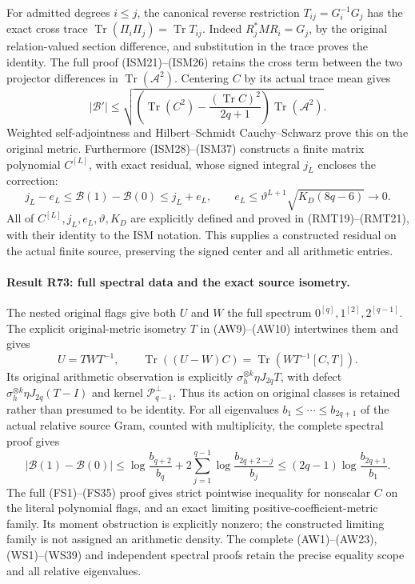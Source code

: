 For admitted degrees \(i\leq j\), the canonical reverse
restriction \(T_{ij}=G_i^{-1}G_j\)
has the exact cross trace
\(\operatorname{Tr}(\Pi_i\Pi_j)=\operatorname{Tr}T_{ij}\).
Indeed \(R_j^*MR_i=G_j\), by the original relation-valued
section difference, and substitution in the trace proves
the identity.  The full proof (ISM21)--(ISM26) retains the
cross term between the two projector differences in
\(\operatorname{Tr}(\mathcal A^2)\).  Centering \(C\) by
its actual trace mean gives
\[
 |\mathcal B'|\leq
 \sqrt{\left(\operatorname{Tr}(C^2)
        -\frac{(\operatorname{Tr}C)^2}{2q+1}\right)
                      \operatorname{Tr}(\mathcal A^2)} .
\]
Weighted self-adjointness and Hilbert--Schmidt
Cauchy--Schwarz prove this on the original metric.
Furthermore (ISM28)--(ISM37) constructs a finite
matrix polynomial \(C^{[L]}\), with exact residual,
whose signed integral \(j_L\) encloses the correction:
\[
 j_L-e_L\leq\mathcal B(1)-\mathcal B(0)\leq j_L+e_L,
 \qquad
 e_L\leq\vartheta^{L+1}\sqrt{K_D(8q-6)}\longrightarrow0.
\]
All of \(C^{[L]},j_L,e_L,\vartheta,K_D\) are explicitly
defined and proved in (RMT19)--(RMT21), with their
identity to the ISM notation.  This supplies a constructed
residual on the actual finite source, preserving the
signed center and all arithmetic entries.

\paragraph{Result R73: full spectral data and the exact source isometry.}
The nested original flags give both $U$ and $W$ the full
spectrum $0^{[q]},1^{[2]},2^{[q-1]}$.
The explicit original-metric isometry $T$ in (AW9)--(AW10)
intertwines them and gives
\[
U=TWT^{-1},\qquad
\operatorname{Tr}((U-W)C)=\operatorname{Tr}(WT^{-1}[C,T]).
\]
Its original arithmetic observation is explicitly
$\sigma_h^{\otimes k}\eta J_{2q}T$, with defect
$\sigma_h^{\otimes k}\eta J_{2q}(T-I)$ and kernel
$\mathcal P_{q-1}^{\perp}$. Thus its action on original
classes is retained rather than presumed to be identity.
For all eigenvalues $b_1\le\cdots\le b_{2q+1}$ of the
actual relative source Gram, counted with multiplicity,
the complete spectral proof gives
\[
|\mathcal B(1)-\mathcal B(0)|
\le\log\frac{b_{q+2}}{b_q}
 +2\sum_{j=1}^{q-1}\log\frac{b_{2q+2-j}}{b_j}
\le(2q-1)\log\frac{b_{2q+1}}{b_1}.
\]
The full (FS1)--(FS35) proof gives strict pointwise
inequality for nonscalar $C$ on the literal polynomial
flags, and an exact limiting positive-coefficient-metric
family. Its moment obstruction is explicitly nonzero;
the constructed limiting family is not assigned an
arithmetic density. The complete (AW1)--(AW23), (WS1)--(WS39)
and independent spectral proofs retain the precise
equality scope and all relative eigenvalues.


